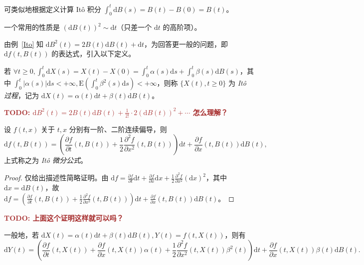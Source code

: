 \documentclass[../main.tex]{subfiles}
\begin{document}
可类似地根据定义计算 It\^o 积分 $\int_0^t\mathrm dB(s)=B(t)-B(0)=B(t)$。

一个常用的性质是 $(\mathrm dB(t))^2\sim\mathrm dt$（只差一个 $\mathrm dt$ 的高阶项）。

由例~\ref{Ito} 知 $\mathrm dB^2(t)=2B(t)\mathrm dB(t)+\mathrm dt$，为回答更一般的问题，即 $\mathrm df(t,B(t))$ 的表达式，引入以下定义。

\begin{definition}\label{def:8.5.3}
    若 $\forall t\geq0,\int_0^t\mathrm dX(s)=X(t)-X(0)=\int_0^t\alpha(s)\mathrm ds+\int_0^t\beta(s)\mathrm dB(s)$，其中 $\int_0^t|\alpha(s)|\mathrm ds<+\infty,\mathrm E(\int_0^t\beta^2(s)\mathrm ds)<+\infty$，则称 $\{X(t),t\geq0\}$ 为 \emph{It\^o 过程}，记为 $\mathrm dX(t)=\alpha(t)\mathrm dt+\beta(t)\mathrm dB(t)$。
\end{definition}

\textbf{\textcolor{brown}{TODO: $\mathrm dB^2(t)=2B(t)\mathrm dB(t)+\frac1{2!}\cdot2(\mathrm dB(t))^2+\cdots$ 怎么理解？}}

\begin{theorem}\label{thm:8.5.1}
    设 $f(t,x)$ 关于 $t,x$ 分别有一阶、二阶连续偏导，则
    \begin{equation*}
        \mathrm df(t,B(t))=\left(\frac{\partial f}{\partial t}(t,B(t))+\frac12\frac{\partial^2f}{\partial x^2}(t,B(t))\right)\mathrm dt+\frac{\partial f}{\partial x}(t,B(t))\mathrm dB(t),
    \end{equation*}
    上式称之为 \emph{It\^o 微分公式}。
\end{theorem}

\begin{proof}
    仅给出描述性简略证明。由 $\mathrm df=\frac{\partial f}{\partial t}\mathrm dt+\frac{\partial f}{\partial x}\mathrm dx+\frac12\frac{\partial^2f}{\partial x^2}(\mathrm dx)^2$，其中 $\mathrm dx=\mathrm dB(t)$，故 $\mathrm df=\left(\frac{\partial f}{\partial t}(t,B(t))+\frac12\frac{\partial^2f}{\partial x^2}(t,B(t))\right)\mathrm dt+\frac{\partial f}{\partial x}(t,B(t))\mathrm dB(t)$。
\end{proof}

\textbf{\textcolor{brown}{TODO: 上面这个证明这样就可以吗？}}

一般地，若 $\mathrm dX(t)=\alpha(t)\mathrm dt+\beta(t)\mathrm dB(t),Y(t)=f(t,X(t))$，则有
\begin{equation*}
    \mathrm dY(t)=\left(\frac{\partial f}{\partial t}(t,X(t))+\frac{\partial f}{\partial x}(t,X(t))\alpha(t)+\frac12\frac{\partial^2f}{\partial x^2}(t,X(t))\beta^2(t)\right)\mathrm dt+\frac{\partial f}{\partial x}(t,X(t))\beta(t)\mathrm dB(t).
\end{equation*}
\end{document}

